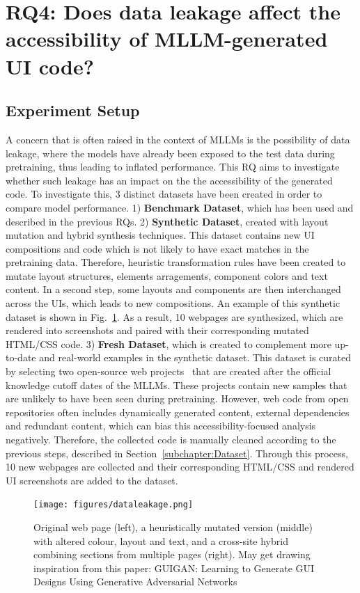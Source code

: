 \section{RQ4: Does data leakage affect the accessibility of MLLM-generated UI code?}
\subsection{Experiment Setup}
A concern that is often raised in the context of MLLMs is 
the possibility of data leakage, where the models have 
already been exposed to the test data during pretraining, 
thus leading to inflated performance. This RQ aims to 
investigate whether such leakage has an impact on the
the accessibility of the generated code.\newline
To investigate this, 3 distinct datasets have been created 
in order to compare model performance. 1) \textbf{Benchmark Dataset},
which has been used and described in the previous RQs. 2)
\textbf{Synthetic Dataset}, created with layout mutation and 
hybrid synthesis techniques. This dataset contains new 
UI compositions and code which is not likely to have 
exact matches in the pretraining data. Therefore, 
heuristic transformation rules have been created to 
mutate layout structures, elements arragements,
component colors and text content. In a second step,
some layouts and components are then interchanged across 
the UIs, which leads to new compositions. An example 
of this synthetic dataset is shown in Fig.~\ref{fig:dataleakagemutation}.
As a result, 10 webpages are synthesized, which are 
rendered into screenshots and paired with their 
corresponding mutated HTML/CSS code. 
3) \textbf{Fresh Dataset}, which is created to complement 
more up-to-date and real-world examples in the synthetic 
dataset. This dataset is curated by selecting two 
open-source web projects~\cite{web:alphaonelabsedu, web:ecommerceferhan}
that are created after the official knowledge cutoff 
dates of the MLLMs. These projects contain new samples 
that are unlikely to have been seen during pretraining.
However, web code from open repositories often 
includes dynamically generated content, external dependencies 
and redundant content, which can bias this accessibility-focused 
analysis negatively. Therefore, the collected code 
is manually cleaned according to the previous 
steps, described in Section~\ref{subchapter:Dataset}.
Through this process, 10 new webpages are collected and
their corresponding HTML/CSS and rendered UI screenshots 
are added to the dataset.

\begin{figure}
  \centering
  \texttt{[image: figures/dataleakage.png]}
  \caption{Original web page (left), a heuristically mutated version (middle) with altered colour, layout and text, and a cross-site hybrid combining sections from multiple pages (right). May get drawing inspiration from this paper: GUIGAN: Learning to Generate GUI Designs Using Generative Adversarial Networks}
  \label{fig:dataleakagemutation} 
\end{figure}